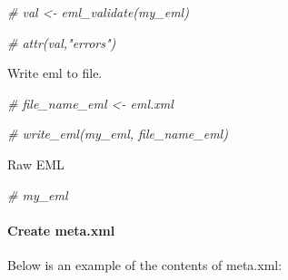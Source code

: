 \documentclass[
]{book}
\newenvironment{Shaded}{\begin{snugshade}}{\end{snugshade}}
\newcommand{\CommentTok}[1]{\textcolor[rgb]{0.56,0.35,0.01}{\textit{#1}}}
\begin{document}
\begin{Shaded}
\begin{Highlighting}[]
\CommentTok{\# val \textless{}{-} eml\_validate(my\_eml)}

\CommentTok{\# attr(val,"errors")}
\end{Highlighting}
\end{Shaded}

Write eml to file.

\begin{Shaded}
\begin{Highlighting}[]
\CommentTok{\# file\_name\_eml \textless{}{-} \textquotesingle{}eml.xml\textquotesingle{}}

\CommentTok{\# write\_eml(my\_eml, file\_name\_eml)}
\end{Highlighting}
\end{Shaded}

Raw EML

\begin{Shaded}
\begin{Highlighting}[]
\CommentTok{\# my\_eml}
\end{Highlighting}
\end{Shaded}

\hypertarget{create-meta.xml}{%
\paragraph{Create meta.xml}\label{create-meta.xml}}

Below is an example of the contents of meta.xml:
\end{document}
